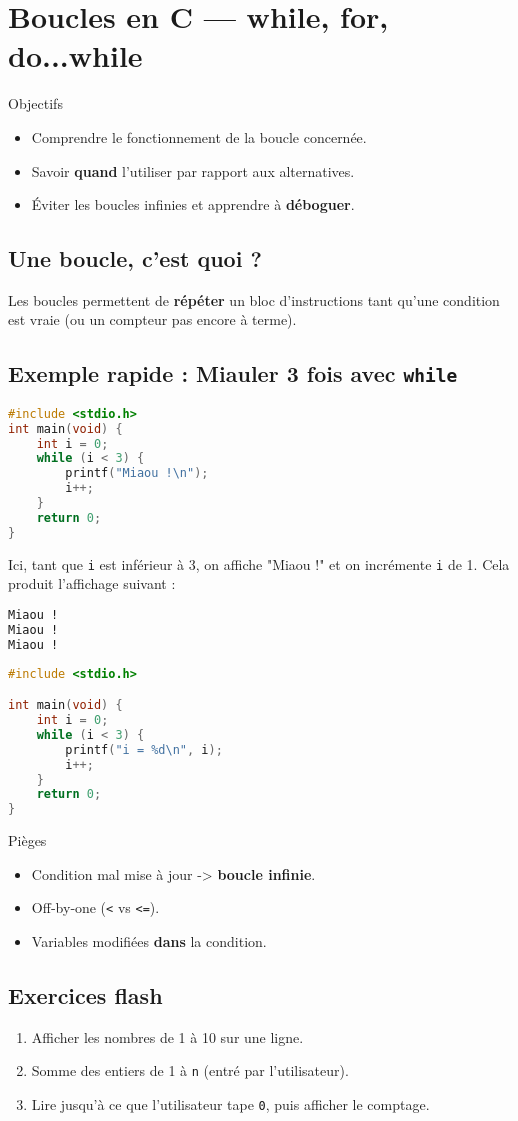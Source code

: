 \section{Boucles en C — while, for, do...while}

\begin{UPSTIinfor}{Objectifs}
	\begin{itemize}
		\item Comprendre le fonctionnement de la boucle concernée.
		\item Savoir \textbf{quand} l'utiliser par rapport aux alternatives.
		\item Éviter les boucles infinies et apprendre à \textbf{déboguer}.
	\end{itemize}
\end{UPSTIinfor}

\subsection{Une boucle, c'est quoi ?}
Les boucles permettent de \textbf{répéter} un bloc d'instructions tant qu'une condition est vraie
(ou un compteur pas encore à terme).

\subsection{Exemple rapide : Miauler 3 fois avec \texttt{while}}

\begin{lstlisting}[language=c]
#include <stdio.h>
int main(void) {
    int i = 0;
    while (i < 3) {
        printf("Miaou !\n");
        i++;
    }
    return 0;
}
\end{lstlisting}
Ici, tant que \texttt{i} est inférieur à 3, on affiche "Miaou !" et on incrémente \texttt{i} de 1.
Cela produit l'affichage suivant :
\begin{lstlisting}[language=bash,style=console]
Miaou !
Miaou !
Miaou ! 
\end{lstlisting}


\begin{lstlisting}[language=c]
#include <stdio.h>

int main(void) {
    int i = 0;
    while (i < 3) {
        printf("i = %d\n", i);
        i++;
    }
    return 0;
}
\end{lstlisting}



\begin{UPSTIwarning}{Pièges}
	\begin{itemize}
		\item Condition mal mise à jour -> \textbf{boucle infinie}.
		\item Off‑by‑one (\texttt{<} vs \texttt{<=}).
		\item Variables modifiées \textbf{dans} la condition.
	\end{itemize}
\end{UPSTIwarning}

\subsection{Exercices flash}
\begin{enumerate}
	\item Afficher les nombres de 1 à 10 sur une ligne.
	\item Somme des entiers de 1 à \texttt{n} (entré par l'utilisateur).
	\item Lire jusqu'à ce que l'utilisateur tape \texttt{0}, puis afficher le comptage.
\end{enumerate}